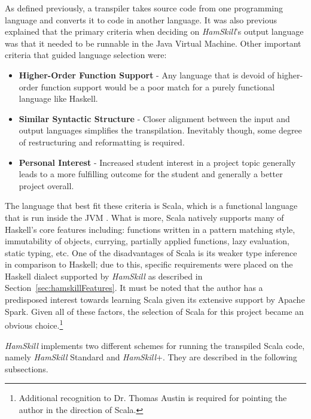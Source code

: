 \documentclass{report}
\begin{document}
As defined previously, a transpiler takes source code from one programming language and converts it to code in another language.  It was also previous explained that the primary criteria when deciding on \textit{HamSkill}'s output language was that it needed to be runnable in the Java Virtual Machine.  Other important criteria that guided language selection were:

\begin{itemize}

	\item \textbf{Higher-Order Function Support} - Any language that is devoid of higher-order function support would be a poor match for a purely functional language like Haskell.
	
	\item \textbf{Similar Syntactic Structure} - Closer alignment between the input and output languages simplifies the transpilation.  Inevitably though, some degree of restructuring and reformatting is required.  
	
	\item \textbf{Personal Interest} - Increased student interest in a project topic generally leads to a more fulfilling outcome for the student and generally a better project overall.  

\end{itemize}

The language that best fit these criteria is Scala, which is a functional language that is run inside the JVM \cite{whatIsScala}. What is more, Scala natively supports many of Haskell's core features including: functions written in a pattern matching style, immutability of objects, currying, partially applied functions, lazy evaluation, static typing, etc.  One of the disadvantages of Scala is its weaker type inference in comparison to Haskell; due to this, specific requirements were placed on the Haskell dialect supported by \textit{HamSkill} as described in Section~\ref{sec:hamskillFeatures}.  It must be noted that the author has a predisposed interest towards learning Scala given its extensive support by Apache Spark.  Given all of these factors, the selection of Scala for this project became an obvious choice.\footnote{Additional recognition to Dr. Thomas Austin is required for pointing the author in the direction of Scala.}

\textit{HamSkill} implements two different schemes for running the transpiled Scala code, namely \textit{HamSkill} Standard and \textit{HamSkill}+.  They are described in the following subsections.
\end{document}
